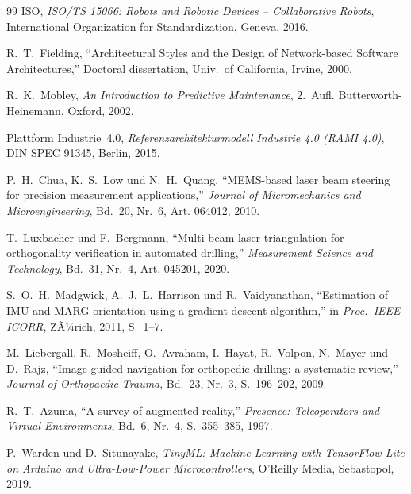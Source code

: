 ﻿\documentclass[a4paper,12pt]{article}
\theoremstyle{definition}
\begin{document}
\begin{thebibliography}{99}
ISO, \textit{ISO/TS 15066: Robots and Robotic Devices -- Collaborative Robots},
International Organization for Standardization, Geneva, 2016.

R.~T.~Fielding, ``Architectural Styles and the Design of Network-based Software Architectures,''
Doctoral dissertation, Univ.\ of California, Irvine, 2000.

R.~K.~Mobley, \textit{An Introduction to Predictive Maintenance},
2.~Aufl. Butterworth-Heinemann, Oxford, 2002.

Plattform Industrie~4.0, \textit{Referenzarchitekturmodell Industrie 4.0 (RAMI 4.0)},
DIN SPEC 91345, Berlin, 2015.

P.~H.~Chua, K.~S.~Low und N.~H.~Quang, ``MEMS-based laser beam steering for
precision measurement applications,'' \textit{Journal of Micromechanics and Microengineering},
Bd.~20, Nr.~6, Art. 064012, 2010.

T.~Luxbacher und F.~Bergmann, ``Multi-beam laser triangulation for orthogonality
verification in automated drilling,'' \textit{Measurement Science and Technology},
Bd.~31, Nr.~4, Art. 045201, 2020.

S.~O.~H.~Madgwick, A.~J.~L.~Harrison und R.~Vaidyanathan, ``Estimation of IMU
and MARG orientation using a gradient descent algorithm,''
in \textit{Proc.\ IEEE ICORR}, ZÃ¼rich, 2011, S.~1--7.

M.~Liebergall, R.~Mosheiff, O.~Avraham, I.~Hayat, R.~Volpon, N.~Mayer und D.~Rajz,
``Image-guided navigation for orthopedic drilling: a systematic review,''
\textit{Journal of Orthopaedic Trauma}, Bd.~23, Nr.~3, S.~196--202, 2009.

R.~T.~Azuma, ``A survey of augmented reality,''
\textit{Presence: Teleoperators and Virtual Environments},
Bd.~6, Nr.~4, S.~355--385, 1997.

P.~Warden und D.~Situnayake, \textit{TinyML: Machine Learning with TensorFlow
Lite on Arduino and Ultra-Low-Power Microcontrollers},
O'Reilly Media, Sebastopol, 2019.

\end{thebibliography}
\end{document}
